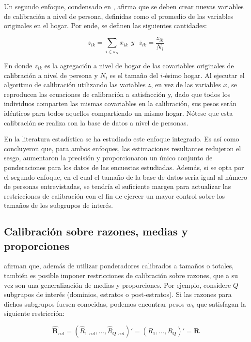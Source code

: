 \documentclass[
  12pt,
  spanish,
]{book}
\begin{document}
Un segundo enfoque, condensado en \citet{Lemaitre_Dufour_1987}, afirma que se deben crear nuevas variables de calibración a nivel de persona, definidas como el promedio de las variables originales en el hogar. Por ende, se definen las siguientes cantidades:

\[
z_{ik}=\sum_{i \in s_{II}} x_{ik}\ \ y\ \ \ {\bar{z}}_{ik}=\frac{z_{ik}}{N_i}
\]

En donde \(z_{ik}\) es la agregación a nivel de hogar de las covariables originales de calibración a nivel de persona y \(N_i\) es el tamaño del \(i\)-ésimo hogar. Al ejecutar el algoritmo de calibración utilizando las variables \(z\), en vez de las variables \(x\), se reproducen las ecuaciones de calibración a satisfacción y, dado que todos los individuos comparten las mismas covariables en la calibración, sus pesos serán idénticos para todos aquellos compartiendo un mismo hogar. Nótese que esta calibración se realiza con la base de datos a nivel de personas.

En la literatura estadística se ha estudiado este enfoque integrado. Es así como \citet{Neethling_Galpin_2006} concluyeron que, para ambos enfoques, las estimaciones resultantes redujeron el sesgo, aumentaron la precisión y proporcionaron un único conjunto de ponderaciones para los datos de las encuestas estudiadas. Además, si se opta por el segundo enfoque, en el cual el tamaño de la base de datos sería igual al número de personas entrevistadas, se tendría el suficiente margen para actualizar las restricciones de calibración con el fin de ejercer un mayor control sobre los tamaños de los subgrupos de interés.

\hypertarget{calibraciuxf3n-sobre-razones-medias-y-proporciones}{%
\subsection{Calibración sobre razones, medias y proporciones}\label{calibraciuxf3n-sobre-razones-medias-y-proporciones}}

\citet{Gutierrez_Zhang_Rodriguez_2016} afirman que, además de utilizar ponderadores calibrados a tamaños o totales, también es posible imponer restricciones de calibración sobre razones, que a su vez son una generalización de medias y proporciones. Por ejemplo, considere \(Q\) subgrupos de interés (dominios, estratos o post-estratos). Si las razones para dichos subgrupos fuesen conocidas, podemos encontrar pesos \(w_k\) que satisfagan la siguiente restricción:

\[
\hat{\textbf{R}}_{cal} = (\hat{R}_{1,cal},...,\hat{R}_{Q,cal})'= (R_1,...,R_Q)'= \textbf{R}
\]
\end{document}
